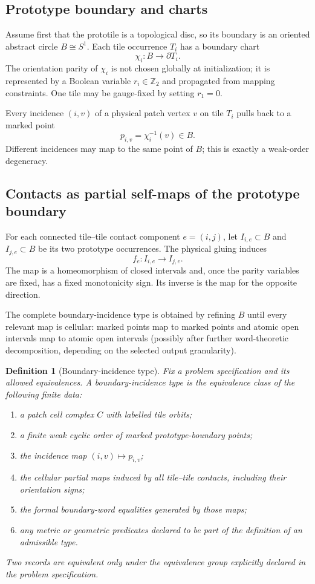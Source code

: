 \documentclass[11pt]{article}
\newtheorem{definition}{Definition}[section]
\begin{document}
\subsection{Prototype boundary and charts}

Assume first that the prototile is a topological disc, so its boundary is an oriented abstract circle $B\cong S^1$.  Each tile occurrence $T_i$ has a boundary chart
\[
  \chi_i:B\longrightarrow \partial T_i.
\]
The orientation parity of $\chi_i$ is not chosen globally at initialization; it is represented by a Boolean variable $r_i\in\mathbb Z_2$ and propagated from mapping constraints.  One tile may be gauge-fixed by setting $r_1=0$.

Every incidence $(i,v)$ of a physical patch vertex $v$ on tile $T_i$ pulls back to a marked point
\[
  p_{i,v}=\chi_i^{-1}(v)\in B.
\]
Different incidences may map to the same point of $B$; this is exactly a weak-order degeneracy.

\subsection{Contacts as partial self-maps of the prototype boundary}

For each connected tile--tile contact component $e=(i,j)$, let $I_{i,e}\subset B$ and $I_{j,e}\subset B$ be its two prototype occurrences.  The physical gluing induces
\[
  f_e:I_{i,e}\longrightarrow I_{j,e}.
\]
The map is a homeomorphism of closed intervals and, once the parity variables are fixed, has a fixed monotonicity sign.  Its inverse is the map for the opposite direction.

The complete boundary-incidence type is obtained by refining $B$ until every relevant map is cellular: marked points map to marked points and atomic open intervals map to atomic open intervals (possibly after further word-theoretic decomposition, depending on the selected output granularity).

\begin{definition}[Boundary-incidence type]
Fix a problem specification and its allowed equivalences.  A boundary-incidence type is the equivalence class of the following finite data:
\begin{enumerate}
  \item a patch cell complex $C$ with labelled tile orbits;
  \item a finite weak cyclic order of marked prototype-boundary points;
  \item the incidence map $(i,v)\mapsto p_{i,v}$;
  \item the cellular partial maps induced by all tile--tile contacts, including their orientation signs;
  \item the formal boundary-word equalities generated by those maps;
  \item any metric or geometric predicates declared to be part of the definition of an admissible type.
\end{enumerate}
Two records are equivalent only under the equivalence group explicitly declared in the problem specification.
\end{definition}
\end{document}
